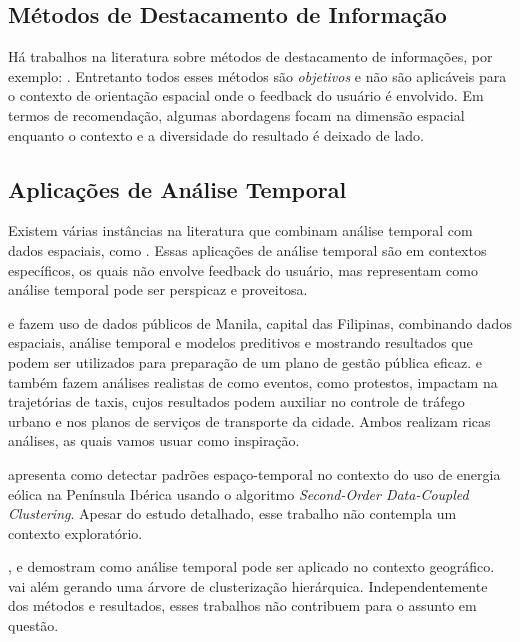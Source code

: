 \subsection{Métodos de Destacamento de Informação}


Há trabalhos na literatura sobre métodos de destacamento de informações, por exemplo: . Entretanto todos esses métodos são {\em objetivos} e não são aplicáveis para o contexto de orientação espacial onde o feedback do usuário é envolvido. Em termos de recomendação, algumas abordagens focam na dimensão espacial \cite{Bao2015,Levandoski:2012} enquanto o contexto e a diversidade do resultado é deixado de lado.

\subsection{Aplicações de Análise Temporal}

Existem várias instâncias na literatura que combinam análise temporal com dados espaciais, como . Essas aplicações de análise temporal são em contextos específicos, os quais não envolve feedback do usuário, mas representam como análise temporal pode ser perspicaz e proveitosa.

 e  fazem uso de dados públicos de Manila, capital das Filipinas, combinando dados espaciais, análise temporal e modelos preditivos e mostrando resultados que podem ser utilizados para preparação de um plano de gestão pública eficaz.  e  também fazem análises realistas de como eventos, como protestos, impactam na trajetórias de taxis, cujos resultados podem auxiliar no controle de tráfego urbano e nos planos de serviços de transporte da cidade. Ambos realizam ricas análises, as quais vamos usuar como inspiração.

 apresenta como detectar padrões espaço-temporal no contexto do uso de energia eólica na Península Ibérica usando o algoritmo {\em Second-Order Data-Coupled Clustering}. Apesar do estudo detalhado, esse trabalho não contempla um contexto exploratório.

,  e  demostram como análise temporal pode ser aplicado no contexto geográfico.  vai além gerando uma árvore de clusterização hierárquica. Independentemente dos métodos e resultados, esses trabalhos não contribuem para o assunto em questão.

